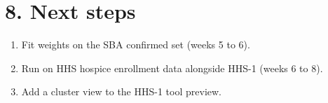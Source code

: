 \documentclass[letterpaper,11pt]{article}
\providecommand{\tightlist}{\setlength{\itemsep}{0pt}\setlength{\parskip}{0pt}}
\begin{document}
\hypertarget{next-steps}{%
\section*{8. Next steps}\label{next-steps}}

\begin{enumerate}
\def\labelenumi{\arabic{enumi}.}
\tightlist
\item
  Fit weights on the SBA confirmed set (weeks 5 to 6).
\item
  Run on HHS hospice enrollment data alongside HHS-1 (weeks 6 to 8).
\item
  Add a cluster view to the HHS-1 tool preview.
\end{enumerate}
\end{document}
